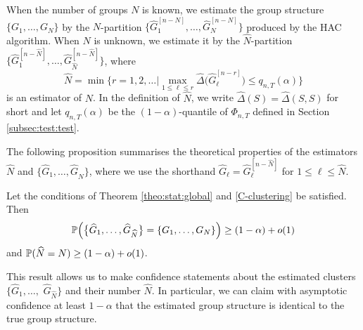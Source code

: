 \documentclass[12pt]{article}
\begin{document}
When the number of groups $N$ is known, we estimate the group structure $\{G_1,\ldots, G_N\}$ by the $N$-partition $\{\widehat{G}_1^{[n-N]},\ldots,\widehat{G}_{N}^{[n-N]}\}$ produced by the HAC algorithm. When $N$ is unknown, we estimate it by the $\widehat{N}$-partition $\{\widehat{G}_1^{[n-\widehat{N}]},\ldots,\widehat{G}_{\widehat{N}}^{[n-\widehat{N}]}\}$, where 
\[ \widehat{N} = \min \Big\{ r = 1,2,\ldots \Big| \max_{1 \le \ell \le r} \widehat{\Delta} \big( \widehat{G}_\ell^{[n-r]} \big) \le q_{n,T}(\alpha) \Big\} \]
is an estimator of $N$. In the definition of $\widehat{N}$, we write $\widehat{\Delta}(S) = \widehat{\Delta}(S,S)$ for short and let $q_{n,T}(\alpha)$ be the $(1-\alpha)$-quantile of $\Phi_{n,T}$ defined in Section \ref{subsec:test:test}. 


The following proposition summarises the theoretical properties of the estimators $\widehat{N}$ and $\{ \widehat{G}_1,\ldots,\widehat{G}_{\widehat{N}} \}$, where we use the shorthand $\widehat{G}_\ell = \widehat{G}_\ell^{[n-\widehat{N}]}$ for $1 \le \ell \le \widehat{N}$. 
\begin{prop}\label{prop:clustering:1}
Let the conditions of Theorem \ref{theo:stat:global} and \ref{C-clustering} be satisfied. Then 
\[ \mathbb{P} \Big( \big\{ \widehat{G}_1,\ldots,\widehat{G}_{\widehat{N}} \big\} = \{ G_1,\ldots, G_N \} \Big) \ge (1-\alpha) + o(1) \]
and $\mathbb{P} ( \widehat{N} = N ) \ge (1-\alpha) + o(1)$. 
\end{prop}
This result allows us to make confidence statements about the estimated clusters $\{ \widehat{G}_1,\ldots, $ $\widehat{G}_{\widehat{N}} \}$ and their number $\widehat{N}$. In particular, we can claim with asymptotic confidence at least $1 - \alpha$ that the estimated group structure is identical to the true group structure. 
\end{document}

